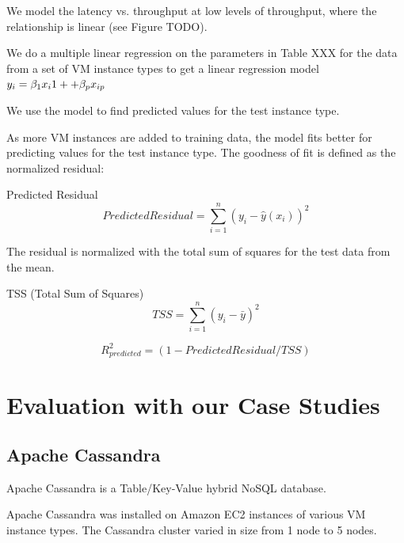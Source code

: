 \documentclass{acm_proc_article-sp}
\begin{document}
We model the latency vs. throughput at low levels of throughput, where the relationship is linear (see Figure TODO).

We do a multiple linear regression on the parameters in Table XXX for the data from a set of VM instance types to get a linear regression model $y_i = \beta_1 x_i1+\dotfill+\beta_{p}x_{ip}$

We use the model to find predicted values for the test instance type.

As more VM instances are added to training data, the model fits better for predicting values for the test instance type.  The goodness of fit is defined as the normalized residual:

\begin{definition}
Predicted Residual
\begin{displaymath}{
Predicted Residual=\sum_{i=1}^{n} (y_i - \hat{y}(x_i))^{2}
}\end{displaymath}

\end{definition}

The residual is normalized with the total sum of squares for the test data from the mean.

\begin{definition}
TSS (Total Sum of Squares)
\begin{displaymath}{
TSS=\sum_{i=1}^{n} (y_i - \bar{y})^{2}
}\end{displaymath}

\begin{displaymath}{
R_{predicted}^2 = (1 - PredictedResidual/TSS)
}\end{displaymath}
\end{definition}

\section{Evaluation with our Case Studies}
\label{sec:eval}

\subsection{Apache Cassandra}

Apache Cassandra is a Table/Key-Value hybrid NoSQL database.

Apache Cassandra was installed on Amazon EC2 instances of various VM instance types. The Cassandra cluster varied in size from 1 node to 5 nodes.
\end{document}
